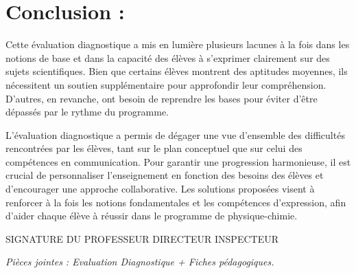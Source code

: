 \documentclass[12pt]{article}
\begin{document}
\section*{Conclusion : }
\hspace{2cm}
Cette évaluation diagnostique a mis en lumière plusieurs lacunes à la fois dans les notions de base et dans la capacité des élèves à s’exprimer clairement sur des sujets scientifiques. Bien que certains élèves montrent des aptitudes moyennes, ils nécessitent un soutien supplémentaire pour approfondir leur compréhension. D’autres, en revanche, ont besoin de reprendre les bases pour éviter d’être dépassés par le rythme du programme.


L’évaluation diagnostique a permis de dégager une vue d’ensemble des difficultés rencontrées par les élèves, tant sur le plan conceptuel que sur celui des compétences en communication. Pour garantir une progression harmonieuse, il est crucial de personnaliser l’enseignement en fonction des besoins des élèves et d’encourager une approche collaborative. Les solutions proposées visent à renforcer à la fois les notions fondamentales et les compétences d’expression, afin d’aider chaque élève à réussir dans le programme de physique-chimie.
 
 \vspace{9cm}
 SIGNATURE DU PROFESSEUR \hspace{3cm} DIRECTEUR  \hspace{3cm} INSPECTEUR

 \vspace{3.85cm}
\emph{Pièces jointes : Evaluation Diagnostique + Fiches pédagogiques.}
\end{document}
